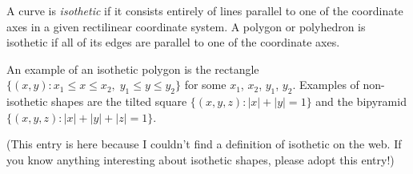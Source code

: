 \documentclass[12pt]{article}
\begin{document}
A curve is {\em isothetic} if it consists entirely of lines parallel to one of the coordinate axes in a given rectilinear coordinate system.  A polygon or polyhedron is isothetic if all of its edges are parallel to one of the coordinate axes.

An example of an isothetic polygon is the rectangle $\{(x,y) : x_1 \le x \le x_2,\; y_1 \le y \le y_2\}$ for some $x_1$, $x_2$, $y_1$, $y_2$.  Examples of non-isothetic shapes are the tilted square $\{(x,y,z) : |x| + |y| = 1 \}$ and the bipyramid $\{(x,y,z) : |x|+|y|+|z|=1 \}$.

(This entry is here because I couldn't find a definition of isothetic on the web.  If you know anything interesting about isothetic shapes, please adopt this entry!)
\end{document}
